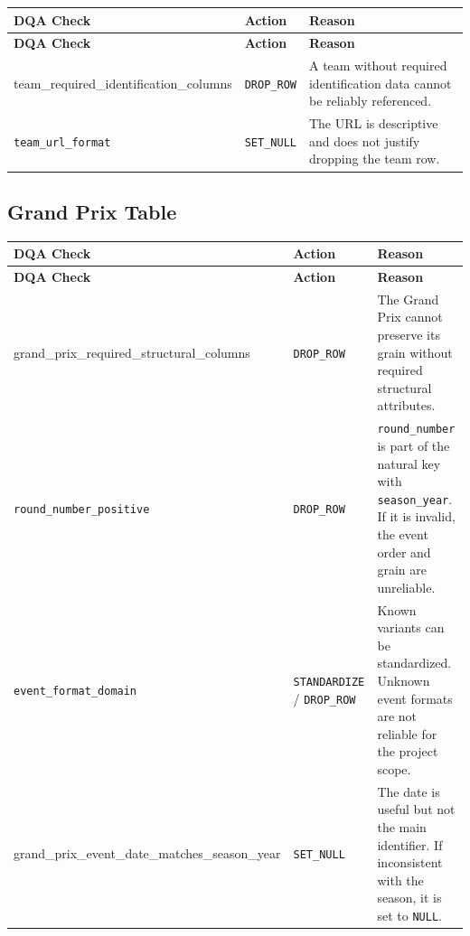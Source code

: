 \documentclass[a4paper,11pt]{article}
\begin{document}
	\begin{longtable}{p{6cm}p{2.5cm}p{6.4cm}}
		\toprule
		\textbf{DQA Check} & \textbf{Action} & \textbf{Reason} \\
		\midrule
		\endfirsthead
		
		\toprule
		\textbf{DQA Check} & \textbf{Action} & \textbf{Reason} \\
		\midrule
		\endhead
		
		\small{team\_required\_identification\_columns}
		& \texttt{DROP\_ROW}
		& A team without required identification data cannot be reliably referenced. \\
		\midrule
		
		\texttt{team\_url\_format}
		& \texttt{SET\_NULL}
		& The URL is descriptive and does not justify dropping the team row. \\
		\bottomrule
	\end{longtable}
	
	\subsection{Grand Prix Table}
	
	\begin{longtable}{p{6cm}p{2.5cm}p{6.4cm}}
		\toprule
		\textbf{DQA Check} & \textbf{Action} & \textbf{Reason} \\
		\midrule
		\endfirsthead
		
		\toprule
		\textbf{DQA Check} & \textbf{Action} & \textbf{Reason} \\
		\midrule
		\endhead
		
		\small{grand\_prix\_required\_structural\_columns}
		& \texttt{DROP\_ROW}
		& The Grand Prix cannot preserve its grain without required structural attributes. \\
		\midrule
		
		\texttt{round\_number\_positive}
		& \texttt{DROP\_ROW}
		& \texttt{round\_number} is part of the natural key with \texttt{season\_year}. If it is invalid, the event order and grain are unreliable. \\
		\midrule
		
		\texttt{event\_format\_domain}
		& \texttt{STANDARDIZE} / \texttt{DROP\_ROW}
		& Known variants can be standardized. Unknown event formats are not reliable for the project scope. \\
		\midrule
		
		\footnotesize{grand\_prix\_event\_date\_matches\_season\_year}
		& \texttt{SET\_NULL}
		& The date is useful but not the main identifier. If inconsistent with the season, it is set to \texttt{NULL}. \\
		\bottomrule
	\end{longtable}
	
\end{document}
